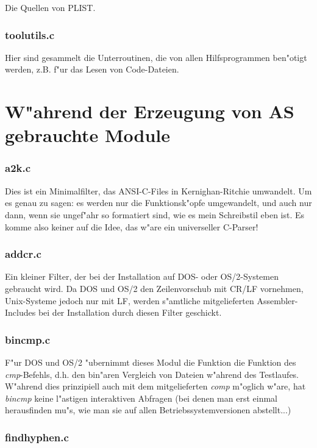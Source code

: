 \documentclass[12pt,a4paper,twoside]{report}
\newcommand{\asname}{AS}
\begin{document}
Die Quellen von PLIST.

\subsubsection{toolutils.c}

Hier sind gesammelt die Unterroutinen, die von allen Hilfsprogrammen
ben"otigt werden, z.B. f"ur das Lesen von Code-Dateien.

\section{W"ahrend der Erzeugung von \asname{} gebrauchte Module}

\subsubsection{a2k.c}

Dies ist ein Minimalfilter, das ANSI-C-Files in Kernighan-Ritchie
umwandelt.  Um es genau zu sagen: es werden nur die Funktionsk"opfe
umgewandelt, und auch nur dann, wenn sie ungef"ahr so formatiert sind, wie
es mein Schreibstil eben ist.  Es komme also keiner auf die Idee, das
w"are ein universeller C-Parser!

\subsubsection{addcr.c}

Ein kleiner Filter, der bei der Installation auf DOS- oder OS/2-Systemen
gebraucht wird.  Da DOS und OS/2 den Zeilenvorschub mit CR/LF vornehmen,
Unix-Systeme jedoch nur mit LF, werden s"amtliche mitgelieferten
Assembler-Includes bei der Installation durch diesen Filter geschickt.

\subsubsection{bincmp.c}

F"ur DOS und OS/2 "ubernimmt dieses Modul die Funktion die Funktion des
{\em cmp}-Befehls, d.h. den bin"aren Vergleich von Dateien w"ahrend des
Testlaufes.  W"ahrend dies prinzipiell auch mit dem mitgelieferten {\em
comp} m"oglich w"are, hat {\em bincmp} keine l"astigen interaktiven
Abfragen (bei denen man erst einmal herausfinden mu"s, wie man sie auf
allen Betriebssystemversionen abstellt...)

\subsubsection{findhyphen.c}
\end{document}
